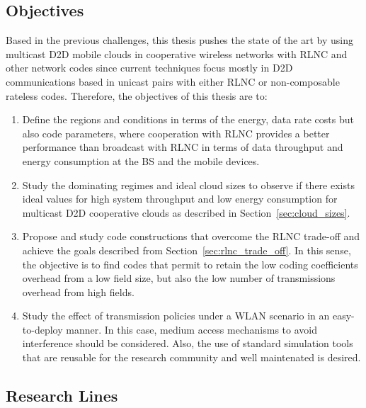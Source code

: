 \subsection{Objectives}
\label{sec:objectives}
Based in the previous challenges, this thesis pushes the state of the art by using multicast \ac{D2D} mobile clouds in cooperative wireless networks with \ac{RLNC} and other network codes since current techniques focus mostly in \ac{D2D} communications based in unicast pairs with either \ac{RLNC} or non-composable rateless codes. Therefore, the objectives of this thesis are to:

\begin{enumerate}

\item Define the regions and conditions in terms of the energy, data rate costs but also code parameters, where cooperation with \ac{RLNC} provides a better performance than broadcast with \ac{RLNC} in terms of data throughput and energy consumption at the \ac{BS} and the mobile devices.

\item Study the dominating regimes and ideal cloud sizes to observe if there exists ideal values for high system throughput and low energy consumption for multicast \ac{D2D} cooperative clouds as described in Section~\ref{sec:cloud_sizes}.

\item Propose and study code constructions that overcome the \ac{RLNC} trade-off and achieve the goals described from Section~\ref{sec:rlnc_trade_off}. In this sense, the objective is to find codes that permit to retain the low coding coefficients overhead from a low field size, but also the low number of transmissions overhead from high fields.

\item Study the effect of transmission policies under a \ac{WLAN} scenario in an easy-to-deploy manner. In this case, medium access mechanisms to avoid interference should be considered. Also, the use of standard simulation tools that are reusable for the research community and well maintenated is desired.

\end{enumerate}

\subsection{Research Lines}

